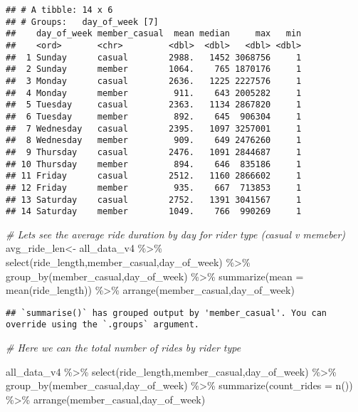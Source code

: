 \documentclass[
]{article}
\newenvironment{Shaded}{\begin{snugshade}}{\end{snugshade}}
\newcommand{\AttributeTok}[1]{\textcolor[rgb]{0.77,0.63,0.00}{#1}}
\newcommand{\CommentTok}[1]{\textcolor[rgb]{0.56,0.35,0.01}{\textit{#1}}}
\newcommand{\FunctionTok}[1]{\textcolor[rgb]{0.00,0.00,0.00}{#1}}
\newcommand{\NormalTok}[1]{#1}
\newcommand{\OtherTok}[1]{\textcolor[rgb]{0.56,0.35,0.01}{#1}}
\newcommand{\SpecialCharTok}[1]{\textcolor[rgb]{0.00,0.00,0.00}{#1}}
\begin{document}
\begin{verbatim}
## # A tibble: 14 x 6
## # Groups:   day_of_week [7]
##    day_of_week member_casual  mean median     max   min
##    <ord>       <chr>         <dbl>  <dbl>   <dbl> <dbl>
##  1 Sunday      casual        2988.   1452 3068756     1
##  2 Sunday      member        1064.    765 1870176     1
##  3 Monday      casual        2636.   1225 2227576     1
##  4 Monday      member         911.    643 2005282     1
##  5 Tuesday     casual        2363.   1134 2867820     1
##  6 Tuesday     member         892.    645  906304     1
##  7 Wednesday   casual        2395.   1097 3257001     1
##  8 Wednesday   member         909.    649 2476260     1
##  9 Thursday    casual        2476.   1091 2844687     1
## 10 Thursday    member         894.    646  835186     1
## 11 Friday      casual        2512.   1160 2866602     1
## 12 Friday      member         935.    667  713853     1
## 13 Saturday    casual        2752.   1391 3041567     1
## 14 Saturday    member        1049.    766  990269     1
\end{verbatim}

\begin{Shaded}
\begin{Highlighting}[]
\CommentTok{\# Let\textquotesingle{}s see the average ride duration by day for rider type (casual v memeber)}
\NormalTok{   avg\_ride\_len}\OtherTok{\textless{}{-}}\NormalTok{ all\_data\_v4 }\SpecialCharTok{\%\textgreater{}\%} 
      \FunctionTok{select}\NormalTok{(ride\_length,member\_casual,day\_of\_week) }\SpecialCharTok{\%\textgreater{}\%} 
      \FunctionTok{group\_by}\NormalTok{(member\_casual,day\_of\_week) }\SpecialCharTok{\%\textgreater{}\%} 
      \FunctionTok{summarize}\NormalTok{(}\AttributeTok{mean =} \FunctionTok{mean}\NormalTok{(ride\_length)) }\SpecialCharTok{\%\textgreater{}\%} 
      \FunctionTok{arrange}\NormalTok{(member\_casual,day\_of\_week)}
\end{Highlighting}
\end{Shaded}

\begin{verbatim}
## `summarise()` has grouped output by 'member_casual'. You can override using the `.groups` argument.
\end{verbatim}

\begin{Shaded}
\begin{Highlighting}[]
\CommentTok{\# Here we can the total number of rides by rider type}
   
\NormalTok{   all\_data\_v4 }\SpecialCharTok{\%\textgreater{}\%} 
      \FunctionTok{select}\NormalTok{(ride\_length,member\_casual,day\_of\_week) }\SpecialCharTok{\%\textgreater{}\%} 
      \FunctionTok{group\_by}\NormalTok{(member\_casual,day\_of\_week) }\SpecialCharTok{\%\textgreater{}\%} 
      \FunctionTok{summarize}\NormalTok{(}\AttributeTok{count\_rides =} \FunctionTok{n}\NormalTok{()) }\SpecialCharTok{\%\textgreater{}\%} 
      \FunctionTok{arrange}\NormalTok{(member\_casual,day\_of\_week)}
\end{Highlighting}
\end{Shaded}
\end{document}
